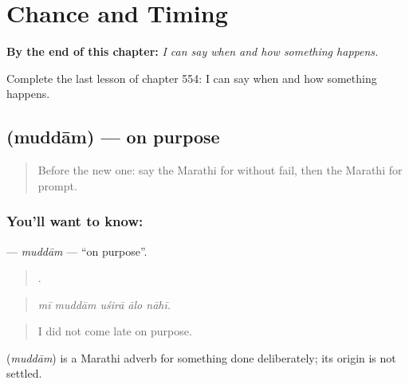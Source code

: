 
\chapter{Chance and Timing}
\label{ch:mr-chance-and-timing}

\begin{chapteropening}
\textbf{By the end of this chapter:} \emph{I can say when and how something happens.}

Complete the last lesson of chapter 554: I can say when and how something happens.
\end{chapteropening}

\section[\texorpdfstring{\mr{मुद्दाम} (muddām)}{मुद्दाम (muddām)}]{ (muddām) — on purpose}

\label{lesson:MR-C554-muddam}



\begin{quote}
Before the new one: say the Marathi for without fail, then the Marathi for prompt.
\end{quote}

\subsection*{You'll want to know: }
\textbf{} — \emph{muddām} — \textquotedblleft{}on purpose\textquotedblright{}.

\begin{quote}
    .
\end{quote}

\begin{quote}
\emph{mī muddām uśirā ālo nāhī.}
\end{quote}

\begin{quote}
I did not come late on purpose.
\end{quote}

\begin{cousinweb}
\textbf{} (\emph{muddām}) is a Marathi adverb for something done deliberately; its origin is not settled.
\end{cousinweb}

